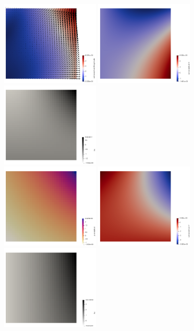 \begin{center}
\includegraphics[width=5cm]{images/benchmark_db2d/vel}
\includegraphics[width=5cm]{images/benchmark_db2d/u}
\includegraphics[width=5cm]{images/benchmark_db2d/bx}\\
\includegraphics[width=5cm]{images/benchmark_db2d/press}
\includegraphics[width=5cm]{images/benchmark_db2d/v}
\includegraphics[width=5cm]{images/benchmark_db2d/by}
\end{center}

